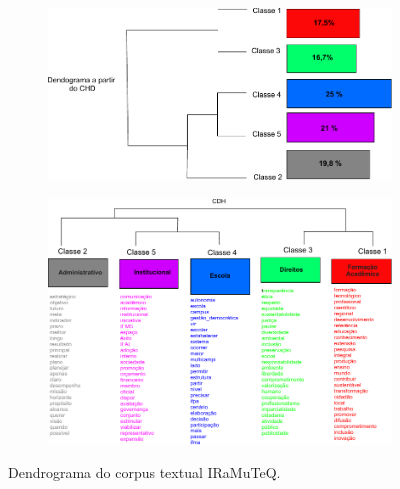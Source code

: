 \documentclass[portuguese]{textolivre}
\begin{document}



\begin{figure}
\centering
\begin{subfigure}[b]{\textwidth}
   \includegraphics[width=1\linewidth]{fig1a.pdf}
   \caption{}
   \label{fig01a} 
\end{subfigure}
\par\bigskip\par\bigskip
\begin{subfigure}[b]{\textwidth}
   \includegraphics[width=1\linewidth]{fig1b.pdf}
   \caption{}
   \label{fig01b}
\end{subfigure}

\caption{Dendrograma do corpus textual IRaMuTeQ.}
\label{fig01}
\end{figure}
\end{document}

